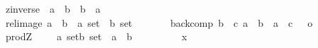 \begin{isabellebody}
\ \ zinverse\ \ {\isacharcolon}{\isacharcolon}{\isachardoublequoteopen}{\isacharparenleft}{\isacharprime}a\ {\isacharless}{\isacharequal}{\isachargreater}\ {\isacharprime}b{\isacharparenright}\ {\isacharequal}{\isachargreater}\ {\isacharparenleft}{\isacharprime}b\ {\isacharless}{\isacharequal}{\isachargreater}\ {\isacharprime}a{\isacharparenright}{\isachardoublequoteclose}\ \ \ \ \ \ \ \ \ \ \ \ \ {\isacharparenleft}{\isachardoublequoteopen}{\isacharunderscore}\ {\isacharpercent}{\isachartilde}{\isachardoublequoteclose}\ \ \ \ {\isacharbrackleft}{}{}{}{}{\isacharbrackright}{}{}{}{\isacharparenright}\ \isanewline
\ \ rel{\isacharunderscore}image\ {\isacharcolon}{\isacharcolon}{\isachardoublequoteopen}{\isacharparenleft}{\isacharprime}a\ {\isacharless}{\isacharequal}{\isachargreater}\ {\isacharprime}b{\isacharparenright}\ {\isacharequal}{\isachargreater}\ {\isacharparenleft}{\isacharprime}a\ set{\isacharparenright}\ {\isacharequal}{\isachargreater}\ {\isacharprime}b\ set{\isachardoublequoteclose}\ \ \ \ \ {\isacharparenleft}{\isachardoublequoteopen}{\isacharunderscore}{\isacharprime}{\isacharparenleft}{\isacharbar}{\isacharunderscore}{\isacharbar}{\isacharprime}{\isacharparenright}{\isachardoublequoteclose}{\isacharbrackleft}{}{}{}{}{\isacharcomma}{}{\isacharbrackright}{}{}{}{\isacharparenright}\isanewline
\ \ back{\isacharunderscore}comp\ {\isacharcolon}{\isacharcolon}{\isachardoublequoteopen}{\isacharbrackleft}{\isacharprime}b\ {\isacharless}{\isacharequal}{\isachargreater}\ {\isacharprime}c{\isacharcomma}\ {\isacharprime}a\ {\isacharless}{\isacharequal}{\isachargreater}\ {\isacharprime}b{\isacharbrackright}\ {\isacharequal}{\isachargreater}\ {\isacharparenleft}{\isacharprime}a\ {\isacharless}{\isacharequal}{\isachargreater}\ {\isacharprime}c{\isacharparenright}{\isachardoublequoteclose}\ \ {\isacharparenleft}{\isachardoublequoteopen}{\isacharunderscore}\ {\isacharpercent}o\ {\isacharunderscore}{\isachardoublequoteclose}\ \ {\isacharbrackleft}{}{}{\isacharcomma}{}{}{\isacharbrackright}\ {}{}{\isacharparenright}\isanewline
\ \ prodZ\ \ \ \ \ {\isacharcolon}{\isacharcolon}{\isachardoublequoteopen}{\isacharbrackleft}{\isacharprime}a\ set{\isacharcomma}{\isacharprime}b\ set{\isacharbrackright}\ {\isacharequal}{\isachargreater}\ {\isacharparenleft}{\isacharprime}a\ {\isacharless}{\isacharequal}{\isachargreater}\ {\isacharprime}b{\isacharparenright}\ {\isachardoublequoteclose}\ \ \ \ \ \ \ \ {\isacharparenleft}{\isachardoublequoteopen}{\isacharunderscore}\ {\isacharpercent}x\ {\isacharunderscore}{\isachardoublequoteclose}\ \ {\isacharbrackleft}{}{}{\isacharcomma}{}{}{\isacharbrackright}\ {}{}{\isacharparenright}\isanewline

\end{isabellebody}
